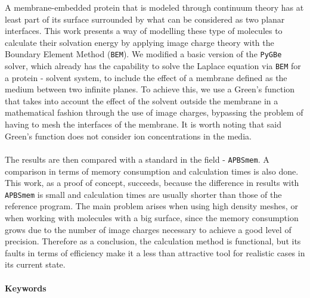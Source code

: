 \noindent
A membrane-embedded protein that is modeled through continuum theory has at least part of its surface surrounded by what can be considered as two planar interfaces. This work presents a way of modelling these type of molecules to calculate their solvation energy by applying image charge theory with the Boundary Element Method (\texttt{BEM}). We modified a basic version of the \texttt{PyGBe} solver, which already has the capability to solve the Laplace equation via \texttt{BEM} for a protein - solvent system, to include the effect of a membrane defined as the medium between two infinite planes. To achieve this, we use a Green's function that takes into account the effect of the solvent outside the membrane in a mathematical fashion through the use of image charges, bypassing the problem of having to mesh the interfaces of the membrane. It is worth noting that said Green's function does not consider ion concentrations in the media.\\\\
The results are then compared with a standard in the field - \texttt{APBSmem}. A comparison in terms of memory consumption and calculation times is also done. This work, as a proof of concept, succeeds, because the difference in results with \texttt{APBSmem} is small and calculation times are usually shorter than those  of the reference program. The main problem arises when using high density meshes, or when working with molecules with a big surface, since the memory consumption grows due to the number of image charges necessary to achieve a good level of precision. Therefore as a conclusion, the calculation method is functional, but its faults in terms of efficiency make it a less than attractive tool for realistic cases in its current state.

\paragraph{Keywords} 